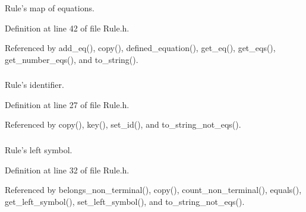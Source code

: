 Rule's map of equations. 



Definition at line 42 of file Rule.h.

Referenced by add\_\-eq(), copy(), defined\_\-equation(), get\_\-eq(), get\_\-eqs(), get\_\-number\_\-eqs(), and to\_\-string().\hypertarget{classgenevalmag_1_1Rule_4dbfbae772914ba343251d7f027f48c6}{
\subsubsection[{r\_\-id}]{}}
\label{classgenevalmag_1_1Rule_4dbfbae772914ba343251d7f027f48c6}


Rule's identifier. 



Definition at line 27 of file Rule.h.

Referenced by copy(), key(), set\_\-id(), and to\_\-string\_\-not\_\-eqs().\hypertarget{classgenevalmag_1_1Rule_7c56c879a7e4fdb2d35c79e061bfe862}{
\subsubsection[{r\_\-left\_\-symbol}]{}}
\label{classgenevalmag_1_1Rule_7c56c879a7e4fdb2d35c79e061bfe862}


Rule's left symbol. 



Definition at line 32 of file Rule.h.

Referenced by belongs\_\-non\_\-terminal(), copy(), count\_\-non\_\-terminal(), equals(), get\_\-left\_\-symbol(), set\_\-left\_\-symbol(), and to\_\-string\_\-not\_\-eqs().\hypertarget{classgenevalmag_1_1Rule_7560aff8568cd1003d0a770729fa4873}{
\subsubsection[{r\_\-offset}]{}}
\label{classgenevalmag_1_1Rule_7560aff8568cd1003d0a770729fa4873}


